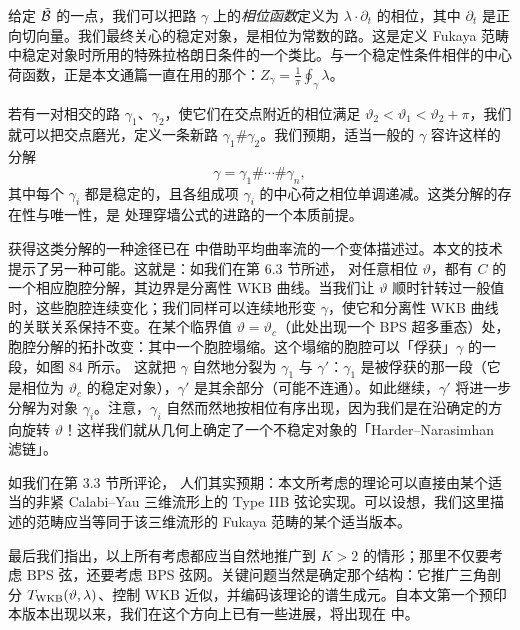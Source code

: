 给定 $\tilde{\mathcal{B}}$ 的一点，我们可以把路 $\gamma$ 上的\emph{相位函数}定义为 $\lambda\cdot\partial_t$ 的相位，其中 $\partial_t$ 是正向切向量。我们最终关心的稳定对象，是相位为常数的路。这是定义 Fukaya 范畴中稳定对象时所用的特殊拉格朗日条件的一个类比。与一个稳定性条件相伴的中心荷函数，正是本文通篇一直在用的那个：$Z_\gamma = \frac{1}{\pi}\oint_\gamma\lambda$。

若有一对相交的路 $\gamma_1$、$\gamma_2$，使它们在交点附近的相位满足 $\vartheta_2<\vartheta_1<\vartheta_2+\pi$，我们就可以把交点磨光，定义一条新路 $\gamma_1\#\gamma_2$。我们预期，适当一般的 $\gamma$ 容许这样的分解
\begin{equation}
\gamma = \gamma_1 \# \cdots \# \gamma_n,
\end{equation}
其中每个 $\gamma_i$ 都是稳定的，且各组成项 $\gamma_i$ 的中心荷之相位单调递减。这类分解的存在性与唯一性，是 \cite{ks1} 处理穿墙公式的进路的一个本质前提。

获得这类分解的一种途径已在 \cite{thomas-yau} 中借助平均曲率流的一个变体描述过。本文的技术提示了另一种可能。这就是：如我们在第 6.3 节所述，%
对任意相位 $\vartheta$，都有 $C$ 的一个相应胞腔分解，其边界是分离性 WKB 曲线。当我们让 $\vartheta$ 顺时针转过一般值时，这些胞腔连续变化；我们同样可以连续地形变 $\gamma$，使它和分离性 WKB 曲线的关联关系保持不变。在某个临界值 $\vartheta=\vartheta_c$（此处出现一个 BPS 超多重态）处，胞腔分解的拓扑改变：其中一个胞腔塌缩。这个塌缩的胞腔可以「俘获」$\gamma$ 的一段，如图 84 所示。%
这就把 $\gamma$ 自然地分裂为 $\gamma_1$ 与 $\gamma'$：$\gamma_1$ 是被俘获的那一段（它是相位为 $\vartheta_c$ 的稳定对象），$\gamma'$ 是其余部分（可能不连通）。如此继续，$\gamma'$ 将进一步分解为对象 $\gamma_i$。注意，$\gamma_i$ 自然而然地按相位有序出现，因为我们是在沿确定的方向旋转 $\vartheta$！这样我们就从几何上确定了一个不稳定对象的「Harder–Narasimhan 滤链」。


如我们在第 3.3 节所评论，%
人们其实预期：本文所考虑的理论可以直接由某个适当的非紧 Calabi–Yau 三维流形上的 Type IIB 弦论实现。可以设想，我们这里描述的范畴应当等同于该三维流形的 Fukaya 范畴的某个适当版本。

最后我们指出，以上所有考虑都应当自然地推广到 $K>2$ 的情形；那里不仅要考虑 BPS 弦，还要考虑 BPS 弦网。关键问题当然是确定那个结构：它推广三角剖分 $T_{\rm WKB}(\vartheta,\lambda)$、控制 WKB 近似，并编码该理论的谱生成元。自本文第一个预印本版本出现以来，我们在这个方向上已有一些进展，将出现在 \cite{gmn5-to-appear} 中。

